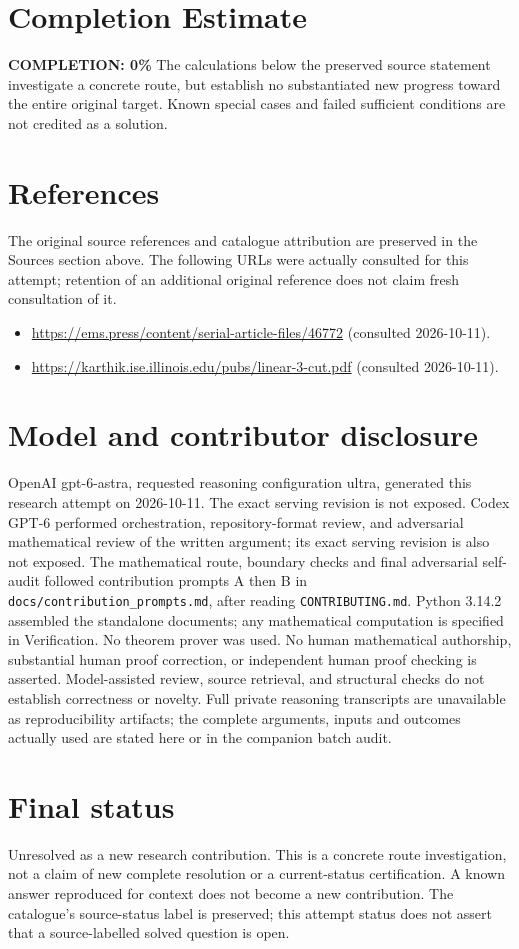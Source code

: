\documentclass[11pt]{article}
\begin{document}
\section{Completion Estimate}
\noindent\textbf{COMPLETION: 0\%}
The calculations below the preserved source statement investigate a concrete route,
but establish no substantiated new progress toward the entire original target.
Known special cases and failed sufficient conditions are not credited as a solution.
\section{References}
The original source references and catalogue attribution are preserved in the
Sources section above. The following URLs were actually consulted for this attempt;
retention of an additional original reference does not claim fresh consultation of it.
\begin{itemize}
\item \url{https://ems.press/content/serial-article-files/46772} (consulted 2026-10-11). 
\item \url{https://karthik.ise.illinois.edu/pubs/linear-3-cut.pdf} (consulted 2026-10-11). 
\end{itemize}
\section{Model and contributor disclosure}
OpenAI gpt-6-astra, requested reasoning configuration ultra, generated this research
attempt on 2026-10-11. The exact serving revision is not exposed. Codex GPT-6
performed orchestration, repository-format review, and adversarial mathematical review of the written argument; its exact serving revision
is also not exposed. The mathematical route, boundary checks and final adversarial
self-audit followed contribution prompts A then B in
\texttt{docs/contribution\_prompts.md}, after reading \texttt{CONTRIBUTING.md}.
Python 3.14.2 assembled the standalone documents; any mathematical computation is
specified in Verification. No theorem prover was used. No human mathematical
authorship, substantial human proof correction, or independent human proof checking
is asserted. Model-assisted review, source retrieval, and structural checks do not
establish correctness or novelty. Full private reasoning transcripts are unavailable
as reproducibility artifacts; the complete arguments, inputs and outcomes actually
used are stated here or in the companion batch audit.
\section{Final status}
Unresolved as a new research contribution. This is a concrete route investigation,
not a claim of new complete resolution or a current-status certification. A known
answer reproduced for context does not become a new contribution. The catalogue's
source-status label is preserved; this attempt status does not assert that a
source-labelled solved question is open.
\end{document}
